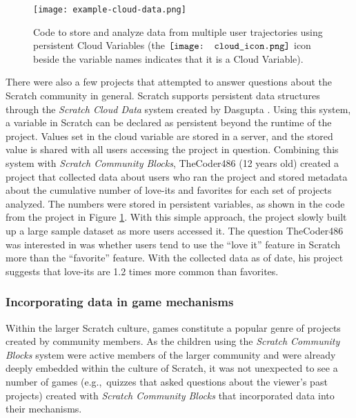 \documentclass{sigchi}
\begin{document}
\begin{figure}[h!]
\texttt{[image: example-cloud-data.png]}
\centering
\caption[Code to store and analyze data from multiple user trajectories using persistent Cloud Variables]{Code to store and analyze data from multiple user trajectories using persistent Cloud Variables (the $\vcenter{\hbox{\texttt{[image: cloud\_icon.png]}}}$ icon beside the variable names indicates that it is a Cloud Variable).}
\label{fig:example-4}
\end{figure}

There were also a few projects that attempted to answer questions about the Scratch community in general. Scratch supports persistent data structures through the \emph{Scratch Cloud Data} system created by Dasgupta \cite{dasgupta_surveys_2013}. Using this system, a variable in Scratch can be declared as persistent beyond the runtime of the project. Values set in the cloud variable are stored in a server, and the stored value is shared with all users accessing the project in question. Combining this system with \emph{Scratch Community Blocks}, TheCoder486 (12 years old) created a project that collected data about users who ran the project and stored metadata about the cumulative number of love-its and favorites for each set of projects analyzed. The numbers were stored in persistent variables, as shown in the code from the project in Figure \ref{fig:example-4}. With this simple approach, the project slowly built up a large sample dataset as more users accessed it. The question TheCoder486 was interested in was whether users tend to use the ``love it'' feature in Scratch more than the ``favorite'' feature. With the collected data as of date, his project suggests that love-its are 1.2 times more common than favorites.

\subsubsection{Incorporating data in game mechanisms}

Within the larger Scratch culture, games constitute a popular genre of projects created by community members. As the children using the \emph{Scratch Community Blocks} system were active members of the larger community and were already deeply embedded within the culture of Scratch, it was not unexpected to see a number of games (e.g.,~quizzes that asked questions about the viewer's past projects) created with \emph{Scratch Community Blocks} that incorporated data into their mechanisms. 
\end{document}
